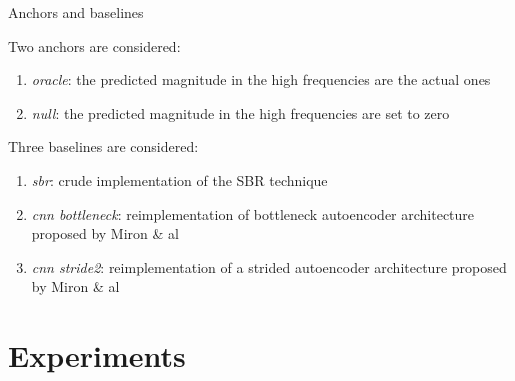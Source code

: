 \documentclass[compress]{beamer}
\begin{document}
\begin{frame}{Anchors and baselines}

Two anchors are considered:
\begin{enumerate}
  \item \textit{oracle}: the predicted magnitude in the high frequencies are the actual ones
  \item \textit{null}: the predicted magnitude in the high frequencies are set to zero
\end{enumerate}

Three baselines are considered:
\begin{enumerate}
  \item \textit{sbr}: crude implementation of the SBR technique
  \item \textit{cnn bottleneck}: reimplementation of bottleneck autoencoder architecture proposed by Miron \& al
  \item \textit{cnn stride2}: reimplementation of a strided autoencoder architecture proposed by Miron \& al 
\end{enumerate}
\end{frame}

\section{Experiments}
\end{document}
